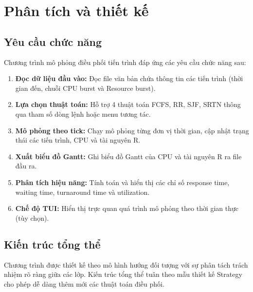 \chapter{Phân tích và thiết kế}

\section{Yêu cầu chức năng}

Chương trình mô phỏng điều phối tiến trình đáp ứng các yêu cầu chức năng sau:

\begin{enumerate}
    \item \textbf{Đọc dữ liệu đầu vào:} Đọc file văn bản chứa thông tin các tiến trình (thời gian đến, chuỗi CPU burst và Resource burst).
    \item \textbf{Lựa chọn thuật toán:} Hỗ trợ 4 thuật toán FCFS, RR, SJF, SRTN thông qua tham số dòng lệnh hoặc menu tương tác.
    \item \textbf{Mô phỏng theo tick:} Chạy mô phỏng từng đơn vị thời gian, cập nhật trạng thái các tiến trình, CPU và tài nguyên R.
    \item \textbf{Xuất biểu đồ Gantt:} Ghi biểu đồ Gantt của CPU và tài nguyên R ra file đầu ra.
    \item \textbf{Phân tích hiệu năng:} Tính toán và hiển thị các chỉ số response time, waiting time, turnaround time và utilization.
    \item \textbf{Chế độ TUI:} Hiển thị trực quan quá trình mô phỏng theo thời gian thực (tùy chọn).
\end{enumerate}

\section{Kiến trúc tổng thể}

Chương trình được thiết kế theo mô hình hướng đối tượng với sự phân tách trách nhiệm rõ ràng giữa các lớp. Kiến trúc tổng thể tuân theo mẫu thiết kế Strategy cho phép dễ dàng thêm mới các thuật toán điều phối.

